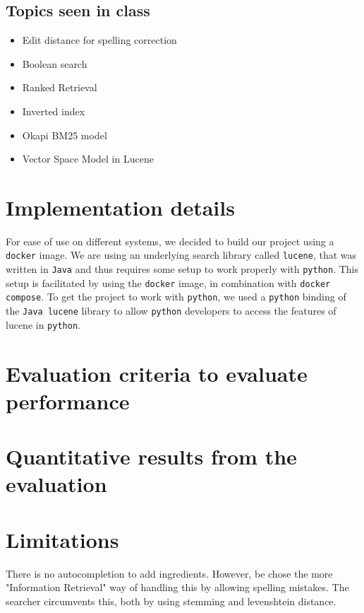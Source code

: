 \documentclass{article}
\begin{document}
\subsection{Topics seen in class}
\begin{itemize}
    \item Edit distance for spelling correction
    \item Boolean search
    \item Ranked Retrieval
    \item Inverted index %
    \item Okapi BM25 model
    \item Vector Space Model in Lucene
\end{itemize}

\section{Implementation details}
For ease of use on different systems, we decided to build our project
using a \texttt{docker} image. We are using an underlying search library called \texttt{lucene},
that was written in \texttt{Java} and thus requires some setup to work properly with
\texttt{python}. This setup is facilitated by using the \texttt{docker} image,
in combination with \texttt{docker compose}.
To get the project to work with \texttt{python}, we used a \texttt{python} binding of the \texttt{Java lucene}
library to allow \texttt{python} developers to access the features of lucene in \texttt{python}.


\section{Evaluation criteria to evaluate performance}

\section{Quantitative results from the evaluation}

\section{Limitations}
There is no autocompletion to add ingredients. However, be chose the more
"Information Retrieval" way of handling this by allowing spelling mistakes.
The searcher circumvents this, both by using stemming and levenshtein distance.
\end{document}

